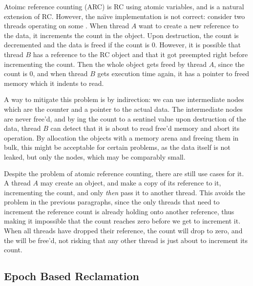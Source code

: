 Atoimc reference counting (ARC) is RC using atomic variables, and is a natural extension of RC\@.
However, the na\"\i{}ve implementation is not correct: consider two threads operating on some
. When thread $A$ want to create a new reference to the data, it increments the count
in the  object. Upon destruction, the count is decremented and the data is freed if the
count is 0. However, it is possible that thread $B$ has a reference to the RC object and that it
got preempted right before incrementing the count. Then the whole object gets freed by thread $A$,
since the count is 0, and when thread $B$ gets execution time again, it has a pointer to freed
memory which it indents to read.

A way to mitigate this problem is by indirection: we can use intermediate  nodes which are
the counter and a pointer to the actual data. The intermediate nodes are never free'd, and by
ing the count to a sentinel value upon destruction of the data, thread $B$ can detect
that it is about to read free'd memory and abort its operation. By allocation the  objects
with a memory arena and freeing them in bulk, this might be acceptable for certain problems, as the
data itself is not leaked, but only the  nodes, which may be comparably small.

Despite the problem of atomic reference counting, there are still use cases for it. A thread $A$
may create an  object, and make a copy of its reference to it, incrementing the count,
and only \emph{then} pass it to another thread. This avoids the problem in the previous paragraphs,
since the only threads that need to increment the reference count is already holding onto another
reference, thus making it impossible that the count reaches zero before we get to increment it.
When all threads have dropped their reference, the count will drop to zero, and the  will
be free'd, not risking that any other thread is just about to increment its count.


\subsection{Epoch Based Reclamation\label{sec:background-ebr}}

